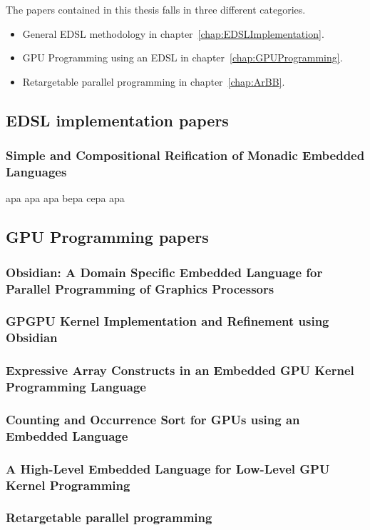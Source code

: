 \documentclass[a4paper]{book}
\newcommand{\paperBB}{Simple and Compositional Reification of Monadic Embedded Languages}
\newcommand{\paperIFL}{Obsidian: A Domain Specific Embedded Language for Parallel Programming of Graphics Processors}
\newcommand{\paperPAPP}{GPGPU Kernel Implementation and Refinement using Obsidian}
\newcommand{\paperEXPRESSIVE}{Expressive Array Constructs in an Embedded GPU Kernel Programming Language}
\newcommand{\paperCSORT}{Counting and Occurrence Sort for GPUs using an Embedded Language}
\newcommand{\paperHL}{A High-Level Embedded Language for Low-Level GPU Kernel Programming}
\begin{document}
The papers contained in this thesis falls in three different categories. 
\begin{itemize} 
\item General EDSL methodology in chapter~\ref{chap:EDSLImplementation}. 
\item GPU Programming using an EDSL in chapter~\ref{chap:GPUProgramming}. 
\item Retargetable parallel programming in chapter~\ref{chap:ArBB}. 
\end{itemize} 

\subsection{EDSL implementation papers} 

\subsubsection{\paperBB} 

apa apa apa bepa cepa apa 

\subsection{GPU Programming papers} 

\subsubsection{\paperIFL}

\subsubsection{\paperPAPP}

\subsubsection{\paperEXPRESSIVE}

\subsubsection{\paperCSORT} 

\subsubsection{\paperHL}

\subsubsection{Retargetable parallel programming} 
\end{document}
